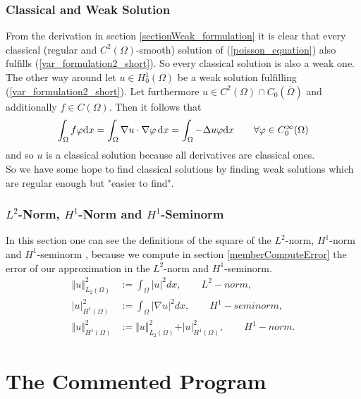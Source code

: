 \documentclass[a4paper, 11pt, twoside]{article}
\begin{document}
\subsubsection{Classical and Weak Solution}
From the derivation in section \ref{sectionWeak_formulation} it is clear that every classical (regular and $C^2(\Omega)$-smooth) solution of (\ref{poisson_equation}) also fulfills (\ref{var_formulation2_short}). So every classical solution is also a weak one. \\
The other way around let $u \in H_0^1(\Omega)$ be a weak solution fulfilling (\ref{var_formulation2_short}). Let furthermore $u \in C^2(\Omega) \cap C_0(\overline{\Omega})$ and additionally $f \in C(\Omega)$. Then it follows that 
\begin{equation}
\int_\Omega f \varphi \mathrm{d} x = \int_\Omega \nabla u \cdot \nabla\varphi\, \mathrm{d} x = \int_\Omega - \Delta u \varphi \mathrm{d} x \qquad \forall \varphi\in C_0^\infty(\Omega) \notag
\end{equation}
and so $u$ is a classical solution because all derivatives are classical ones. \\
So we have some hope to find classical solutions by finding weak solutions which are regular enough but "easier to find".

\subsubsection{$L^2$-Norm, $H^1$-Norm and $H^1$-Seminorm}\label{sectionnorms}
In this section one can see the definitions of the square of the $L^2$-norm, $H^1$-norm and $H^1$-seminorm \cite{evans}, because we compute in section \ref{memberComputeError} the error of our approximation in the $L^2$-norm and $H^1$-seminorm.
\begin{align*}
\Vert u \Vert_{L_2(\Omega)}^2 &:= \int_\Omega \vert u \vert^2 dx, \qquad L^2-\textit{norm}, \\
\vert u \vert_{H^1(\Omega)}^2 &:= \int_\Omega \vert \nabla u \vert^2 dx, \qquad H^1-\textit{seminorm}, \\
\Vert u \Vert_{H^1(\Omega)}^2 &:= \Vert u \Vert_{L_2(\Omega)}^2 + \vert u \vert_{H^1(\Omega)}^2, \qquad H^1-\textit{norm}.
\end{align*}

\section{The Commented Program}
\end{document}
